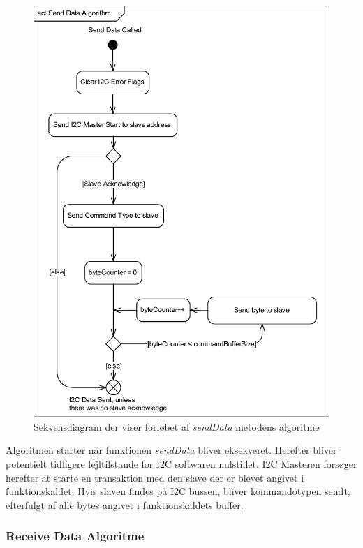 \begin{figure}[H]
	\centering
	\includegraphics[width=\textwidth]{DesignOgImplementering/images/sendDataAlgorithm}
	\caption{Sekvensdiagram der viser forløbet af \textit{sendData} metodens algoritme}
	\label{figure:SendDataAlgorithm}
\end{figure}

Algoritmen starter når funktionen \textit{sendData} bliver eksekveret. Herefter bliver potentielt tidligere fejltilstande for I2C softwaren nulstillet. I2C Masteren forsøger herefter at starte en transaktion med den slave der er blevet angivet i funktionskaldet. Hvis slaven findes på I2C bussen, bliver kommandotypen sendt, efterfulgt af alle bytes angivet i funktionskaldets buffer.

\subsubsection{Receive Data Algoritme}

